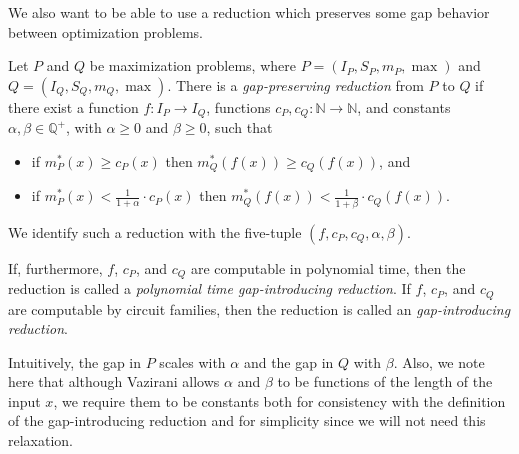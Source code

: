 \documentclass[]{article}
\begin{document}

We also want to be able to use a reduction which preserves some gap behavior between optimization problems.

\begin{definition}
  Let $P$ and $Q$ be maximization problems, where $P = (I_P, S_P, m_P, \max)$ and $Q = (I_Q, S_Q, m_Q, \max)$.
  There is a \emph{gap-preserving reduction} from $P$ to $Q$ if there exist a function $f \colon I_P \to I_Q$, functions $c_P, c_Q \colon \mathbb{N} \to \mathbb{N}$, and constants $\alpha, \beta \in \mathbb{Q}^+$, with $\alpha \geq 0$ and $\beta \geq 0$, such that
  \begin{itemize}
  \item if $m^*_P(x) \geq c_P(x)$ then $m^*_Q(f(x)) \geq c_Q(f(x))$, and
  \item if $m^*_P(x) < \frac{1}{1 + \alpha} \cdot c_P(x)$ then $m^*_Q(f(x)) < \frac{1}{1 + \beta} \cdot c_Q(f(x))$.
  \end{itemize}
  We identify such a reduction with the five-tuple $(f, c_P, c_Q, \alpha, \beta)$.

  If, furthermore, $f$, $c_P$, and $c_Q$ are computable in polynomial time, then the reduction is called a \emph{polynomial time gap-introducing reduction}.
  If $f$, $c_P$, and $c_Q$ are computable by \FNC{} circuit families, then the reduction is called an \emph{\NC{} gap-introducing reduction}.
\end{definition}

Intuitively, the gap in $P$ scales with $\alpha$ and the gap in $Q$ with $\beta$.
Also, we note here that although Vazirani allows $\alpha$ and $\beta$ to be functions of the length of the input $x$, we require them to be constants both for consistency with the definition of the gap-introducing reduction and for simplicity since we will not need this relaxation.
\end{document}
